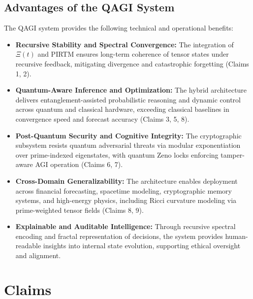 \documentclass{article}
\theoremstyle{plain}
\theoremstyle{claimstyle}
\begin{document}
\subsection{Advantages of the QAGI System}

The QAGI system provides the following technical and operational benefits:

\begin{itemize}
    \item \textbf{Recursive Stability and Spectral Convergence:} The integration of \( \Xi(t) \) and PIRTM ensures long-term coherence of tensor states under recursive feedback, mitigating divergence and catastrophic forgetting (Claims 1, 2).

    \item \textbf{Quantum-Aware Inference and Optimization:} The hybrid architecture delivers entanglement-assisted probabilistic reasoning and dynamic control across quantum and classical hardware, exceeding classical baselines in convergence speed and forecast accuracy (Claims 3, 5, 8).

    \item \textbf{Post-Quantum Security and Cognitive Integrity:} The cryptographic subsystem resists quantum adversarial threats via modular exponentiation over prime-indexed eigenstates, with quantum Zeno locks enforcing tamper-aware AGI operation (Claims 6, 7).

    \item \textbf{Cross-Domain Generalizability:} The architecture enables deployment across financial forecasting, spacetime modeling, cryptographic memory systems, and high-energy physics, including Ricci curvature modeling via prime-weighted tensor fields (Claims 8, 9).

    \item \textbf{Explainable and Auditable Intelligence:} Through recursive spectral encoding and fractal representation of decisions, the system provides human-readable insights into internal state evolution, supporting ethical oversight and alignment.
\end{itemize}

\section{Claims}
\end{document}

